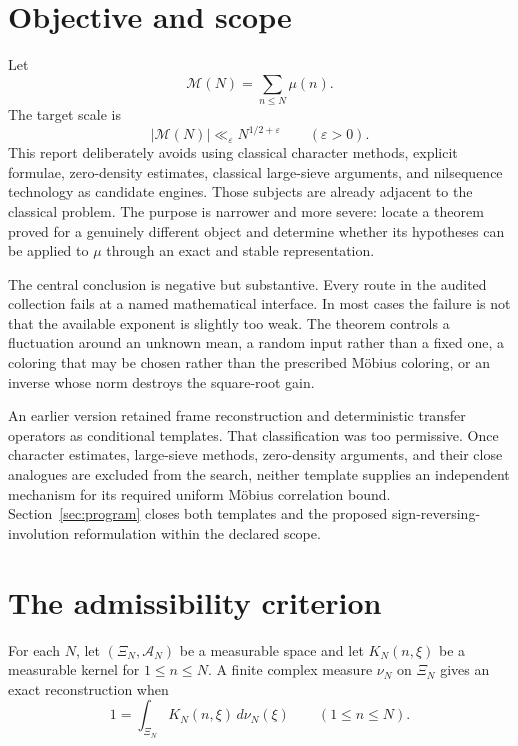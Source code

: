 \documentclass[11pt]{amsart}
\numberwithin{equation}{section}
\theoremstyle{plain}
\theoremstyle{definition}
\theoremstyle{remark}
\newcommand{\Mertens}{\mathcal M}
\newcommand{\eps}{\varepsilon}
\begin{document}
\section{Objective and scope}\label{sec:objective}

Let
\begin{equation}\label{eq:mertens-sum}
  \Mertens(N)=\sum_{n\leq N}\mu(n).
\end{equation}
The target scale is
\begin{equation}\label{eq:target}
  |\Mertens(N)|\ll_{\eps}N^{1/2+\eps}
  \qquad (\eps>0).
\end{equation}
This report deliberately avoids using classical character methods, explicit
formulae, zero-density estimates, classical large-sieve arguments, and nilsequence
technology as candidate engines.  Those subjects are already adjacent to the
classical problem.  The purpose is narrower and more severe: locate a theorem
proved for a genuinely different object and determine whether its hypotheses
can be applied to \(\mu\) through an exact and stable representation.

The central conclusion is negative but substantive.  Every route in the
audited collection fails at a named mathematical interface.  In most cases the failure is not
that the available exponent is slightly too weak.  The theorem controls a
fluctuation around an unknown mean, a random input rather than a fixed one, a
coloring that may be chosen rather than the prescribed M\"obius coloring, or
an inverse whose norm destroys the square-root gain.

An earlier version retained frame reconstruction and deterministic transfer
operators as conditional templates.  That classification was too permissive.
Once character estimates, large-sieve methods, zero-density arguments, and
their close analogues are excluded from the search, neither template supplies
an independent mechanism for its required uniform M\"obius correlation bound.
Section~\ref{sec:program} closes both templates and the proposed
sign-reversing-involution reformulation within the declared scope.

\section{The admissibility criterion}\label{sec:criterion}

For each \(N\), let \((\Xi_N,\mathcal A_N)\) be a measurable space and let
\(K_N(n,\xi)\) be a measurable kernel for \(1\leq n\leq N\).  A finite complex
measure \(\nu_N\) on \(\Xi_N\) gives an exact reconstruction when
\begin{equation}\label{eq:exact-reconstruction}
  1=\int_{\Xi_N}K_N(n,\xi)\,d\nu_N(\xi)
  \qquad (1\leq n\leq N).
\end{equation}
\end{document}
